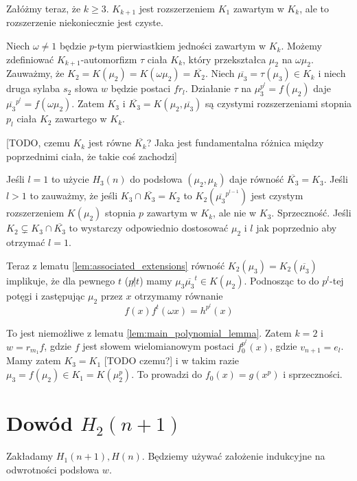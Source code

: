 Załóżmy teraz, że $k \geq 3$. $K_{k+1}$ jest rozszerzeniem $K_1$ zawartym w
$K_k$, ale to rozszerzenie niekoniecznie jest czyste.

Niech $\omega \neq 1$ będzie $p$-tym pierwiastkiem jedności zawartym w $K_k$.
Możemy zdefiniować $K_{k+1}$-automorfizm $\tau$ ciała $K_k$, który przekształca
$\mu_2$ na $\omega \mu_2$.
Zauważmy, że $K_2 = K\left(\mu_2\right) = K\left(\omega \mu_2\right) =
\overline{K_2}$.
Niech $\overline{\mu_3} = \tau(\mu_3) \in K_k$ i niech druga sylaba $s_2$ słowa
$w$ będzie postaci $fr_l$.
Działanie $\tau$ na $\mu_3^{p^l} = f\left(\mu_2\right)$ daje
$\overline{\mu_3}^{p^l} = f\left(\omega\mu_2\right)$. Zatem $K_3$ i
$\overline{K_3} = K\left(\mu_2, \overline{\mu_3}\right)$ są czystymi
rozszerzeniami stopnia $p_l$ ciała $K_2$ zawartego w $K_k$.

[TODO, czemu $K_k$ jest równe $\overline{K_k}$? Jaka jest fundamentalna różnica
między poprzednimi ciała, że takie coś zachodzi]

Jeśli $l = 1$ to użycie $H_3(n)$ do podsłowa $\left(\mu_2, \mu_k\right)$ daje
równość $\overline{K_3} = K_3$. Jeśli $l > 1$ to zauważmy, że jeśli $K_3 \cap
\overline{K_3} = K_2$ to $K_2\left(\overline{\mu_3}^{p^{l-1}}\right)$ jest
czystym rozszerzeniem $K\left(\mu_2\right)$ stopnia $p$ zawartym w $K_k$, ale
nie w $K_3$. Sprzeczność. Jeśli $K_2 \subsetneq K_3 \cap \overline{K_3}$ to
wystarczy odpowiednio dostosować $\mu_2$ i $l$ jak poprzednio aby otrzymać
$l=1$.

Teraz z lematu \ref{lem:associated_extensions} równość $K_2\left(\mu_3\right) =
K_2\left(\overline{\mu_3}\right)$ implikuje, że dla pewnego $t$ ($p \not | t$)
mamy $\mu_3\overline{\mu_3}^t \in K\left(\mu_2\right)$. Podnosząc to do
$p^l$-tej potęgi i zastępując $\mu_2$ przez $x$ otrzymamy równanie
\[ f(x)f^t(\omega x) = h^{p^l}(x)\]

To jest niemożliwe z lematu \ref{lem:main_polynomial_lemma}. Zatem $k = 2$ i $w
= r_{m_1}f$, gdzie $f$ jest słowem wielomianowym postaci $f_0^{p^l}(x)$, gdzie
$v_{n+1} = e_l$. Mamy zatem $K_3 = K_1$ [TODO czemu?] i  w takim razie $\mu_3 =
f\left(\mu_2\right) \in K_1 = K\left(\mu_2^p\right)$. To prowadzi do $f_0(x) =
g\left(x^p\right)$ i sprzeczności.

\section{Dowód $H_2(n+1)$}
Zakładamy $H_1(n+1), H(n)$. Będziemy używać założenie indukcyjne na odwrotności
podsłowa $w$.

